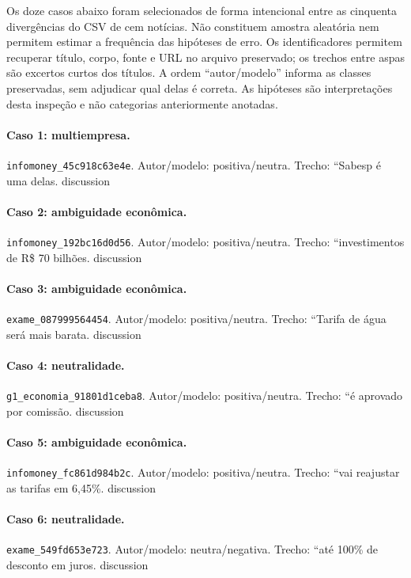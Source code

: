 Os doze casos abaixo foram selecionados de forma intencional entre as cinquenta divergências do CSV de cem notícias. Não constituem amostra aleatória nem permitem estimar a frequência das hipóteses de erro. Os identificadores permitem recuperar título, corpo, fonte e URL no arquivo preservado; os trechos entre aspas são excertos curtos dos títulos. A ordem ``autor/modelo'' informa as classes preservadas, sem adjudicar qual delas é correta. As hipóteses são interpretações desta inspeção e não categorias anteriormente anotadas.

\paragraph{Caso 1: multiempresa.}
\texttt{infomoney\_\allowbreak{}45c918c63e4e}. Autor/modelo: positiva/neutra. Trecho: ``Sabesp é uma delas. {discussion}

\paragraph{Caso 2: ambiguidade econômica.}
\texttt{infomoney\_\allowbreak{}192bc16d0d56}. Autor/modelo: positiva/neutra. Trecho: ``investimentos de R\$ 70 bilhões. {discussion}

\paragraph{Caso 3: ambiguidade econômica.}
\texttt{exame\_\allowbreak{}087999564454}. Autor/modelo: positiva/neutra. Trecho: ``Tarifa de água será mais barata. {discussion}

\paragraph{Caso 4: neutralidade.}
\texttt{g1\_\allowbreak{}economia\_\allowbreak{}91801d1ceba8}. Autor/modelo: positiva/neutra. Trecho: ``é aprovado por comissão. {discussion}

\paragraph{Caso 5: ambiguidade econômica.}
\texttt{infomoney\_\allowbreak{}fc861d984b2c}. Autor/modelo: positiva/neutra. Trecho: ``vai reajustar as tarifas em 6,45\%. {discussion}

\paragraph{Caso 6: neutralidade.}
\texttt{exame\_\allowbreak{}549fd653e723}. Autor/modelo: neutra/negativa. Trecho: ``até 100\% de desconto em juros. {discussion}


